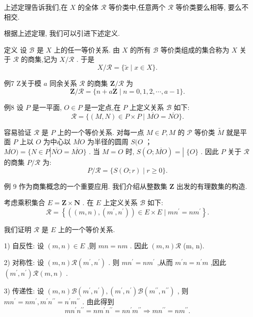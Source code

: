 上述定理告诉我们,在 $X$ 的全体 $\mathcal{R}$ 等价类中,任意两个 $\mathcal{R}$ 等价类要么相等, 要么不相交.

根据上述定理, 我们可以引进下述定义.

定义 设 $\mathcal{B}$ 是 $X$ 上的任一等价关系. 由 $X$ 的所有 $\mathcal{B}$ 等价类组成的集合称为 $X$ 关于 $\mathcal{R}$ 的商集,记为 $X/\mathcal{R}$ . 于是
$$X/\mathcal{R} = \{ \widetilde{x} \mid  x \in  X\} .$$

例7 Z关于模 $a$ 同余关系 $\mathcal{R}$ 的商集 $\mathbf{Z}/\mathcal{R}$ 为
$$\mathbf{Z}/\mathcal{R} = \{ n + a\mathbf{Z} \mid  n = 0,1,2,\cdots ,a - 1\} .$$

例8 设 $P$ 是一平面, $O \in  P$ 是一定点,在 $P$ 上定义关系 $\mathcal{B}$ 如下:
$$\mathcal{R} = \{ \left( {M,N}\right)  \in  P \times  P \mid  \overline{MO} = \overline{NO}\} .$$

容易验证 $\mathcal{R}$ 是 $P$ 上的一个等价关系. 对每一点 $M \in  P,M$ 的 $\mathcal{P}$ 等价类 $\widetilde{M}$ 就是平面 $P$ 上以 $O$ 为中心以 $\overline{MO}$ 为半径的圆周 $S(O$ ； $\overline{MO}) = \{ N \in  P\left| {\overline{NO} = \overline{MO}\} \text{ . 当 }M = O\text{ 时, }S\left( {O;\overline{MO}}\right)  = }\right|$  $\{ O\}$ . 因此 $P$ 关于 $\mathcal{R}$ 的商集 $P/\mathcal{R}$ 为:
$$P/\mathcal{R} = \{ S\left( {O;r}\right)  \mid  r \geq  0\} .$$

例 9 作为商集概念的一个重要应用. 我们介绍从整数集 $\mathbf{Z}$ 出发的有理数集的构造.

考虑乘积集合 $E = \mathbf{Z} \times  \mathbf{N}$ . 在 $E$ 上定义关系 $\mathcal{B}$ 如下:
$$\mathcal{R} = \left\{  {\left( {\left( {m,n}\right) ,\left( {{m}^{\prime },{n}^{\prime }}\right) }\right)  \in  E \times  E \mid  m{n}^{\prime } = n{m}^{\prime }}\right\}  .$$

我们证明 $\mathcal{R}$ 是 $E$ 上的一个等价关系.

1) 自反性: 设 $\left( {m,n}\right)  \in  E$ ,则 ${mn} = {nm}$ . 因此 $\left( {m,n}\right) \mathcal{R}$ (m, n).

2) 对称性: 设 $\left( {m,n}\right) \mathcal{R}\left( {{m}^{\prime },{n}^{\prime }}\right)$ . 则 $m{n}^{\prime } = n{m}^{\prime }$ ,从而 ${m}^{\prime }n = {n}^{\prime }m$ ,因此 $\left( {{m}^{\prime },{n}^{\prime }}\right) \mathcal{R}\left( {m,n}\right)$ .

3) 传递性: 设 $\left( {m,n}\right) \mathcal{B}\left( {{m}^{\prime },{n}^{\prime }}\right) ,\left( {{m}^{\prime },{n}^{\prime }}\right) \mathcal{B}\left( {{m}^{\prime \prime },{n}^{\prime \prime }}\right)$ , 则 $m{n}^{\prime } = n{m}^{\prime },{m}^{\prime }{n}^{\prime \prime } = {n}^{\prime }{m}^{\prime \prime }$ . 由此得到
$$m{n}^{\prime }{n}^{\prime \prime } = n{m}^{\prime }{n}^{\prime \prime } = n{n}^{\prime }{m}^{\prime \prime } \Rightarrow  m{n}^{\prime \prime } = n{m}^{\prime \prime }.$$

